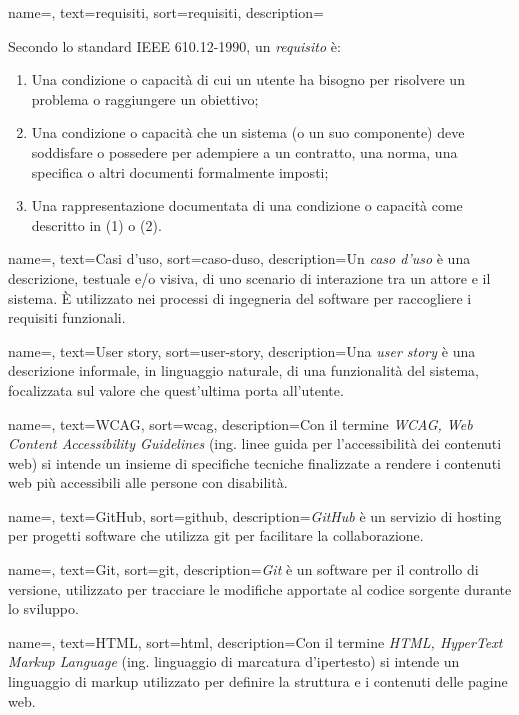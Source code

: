  {
    name=,
    text=requisiti,
    sort=requisiti,
    description={Secondo lo standard IEEE 610.12-1990, un \emph{requisito} è:
    \begin{enumerate}
        \item Una condizione o capacità di cui un utente ha bisogno per risolvere un problema o raggiungere un obiettivo;
        \item Una condizione o capacità che un sistema (o un suo componente) deve soddisfare o possedere per adempiere a un contratto, una norma, una specifica o altri documenti formalmente imposti;
        \item Una rappresentazione documentata di una condizione o capacità come descritto in (1) o (2).
    \end{enumerate}
    }
}

 {
    name=,
    text=Casi d'uso,
    sort=caso-duso,
    description={Un \emph{caso d'uso} è una descrizione, testuale e/o visiva, di uno scenario di interazione tra un attore e il sistema. È utilizzato nei processi di ingegneria del software per raccogliere i requisiti funzionali.}
}

 {
    name=,
    text=User story,
    sort=user-story,
    description={Una \emph{user story} è una descrizione informale, in linguaggio naturale, di una funzionalità del sistema, focalizzata sul valore che quest'ultima porta all'utente.}
}

 {
    name=,
    text=WCAG,
    sort=wcag,
    description={Con il termine \emph{WCAG, Web Content Accessibility Guidelines} (ing. linee guida per l'accessibilità dei contenuti web) si intende un insieme di specifiche tecniche finalizzate a rendere i contenuti web più accessibili alle persone con disabilità.}
}

 {
    name=,
    text=GitHub,
    sort=github,
    description={\emph{GitHub} è un servizio di hosting per progetti software che utilizza \gls{git} per facilitare la collaborazione.}
}

 {
    name=,
    text=Git,
    sort=git,
    description={\emph{Git} è un software per il controllo di versione, utilizzato per tracciare le modifiche apportate al codice sorgente durante lo sviluppo.}
}

 {
    name=,
    text=HTML,
    sort=html,
    description={Con il termine \emph{HTML, HyperText Markup Language} (ing. linguaggio di marcatura d'ipertesto) si intende un linguaggio di markup utilizzato per definire la struttura e i contenuti delle pagine web.}
}


